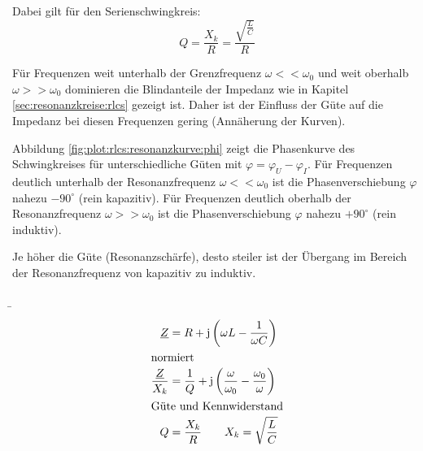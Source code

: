 \begin{frame}[t]
{Dabei gilt für den Serienschwingkreis:
\begin{equation}
    Q = \frac{X_k}{R} = \frac{\sqrt{\frac{L}{C}}}{R}
\end{equation}

Für Frequenzen weit unterhalb der Grenzfrequenz $\omega << \omega_0$ und weit oberhalb $\omega >> \omega_0$
dominieren die Blindanteile der Impedanz wie in Kapitel \ref{sec:resonanzkreise:rlcs} gezeigt ist. 
Daher ist der Einfluss der Güte auf die Impedanz bei diesen Frequenzen gering (Annäherung der Kurven).


Abbildung \ref{fig:plot:rlcs:resonanzkurve:phi} zeigt die Phasenkurve des Schwingkreises für unterschiedliche Güten mit $\varphi = \varphi_U - \varphi_I$.
Für Frequenzen deutlich unterhalb der Resonanzfrequenz $\omega << \omega_0$ ist die Phasenverschiebung $\varphi$ nahezu $-90^\circ$ (rein kapazitiv).
Für Frequenzen deutlich oberhalb der Resonanzfrequenz $\omega >> \omega_0$ ist die Phasenverschiebung $\varphi$ nahezu $+90^\circ$ (rein induktiv).

Je höher die Güte (Resonanzschärfe), desto steiler ist der Übergang im Bereich der Resonanzfrequenz von kapazitiv zu induktiv.
}%
\b{%
\begin{minipage}{0.3\textwidth}%
\begin{align}
    \underline{Z} &= R + \mathrm{j}\left(\omega L - \frac{1}{\omega C}\right)\\
        \intertext{normiert}
    \frac{\underline{Z}}{X_k} &= \frac{1}{Q} + \mathrm{j}\left(\frac{\omega}{\omega_0} - \frac{\omega_0}{\omega}\right)\\
        \intertext{Güte und Kennwiderstand}
    Q &= \frac{X_k}{R} \qquad X_k = \sqrt{\frac{L}{C}}
\end{align}
\end{minipage}\hfill%
\begin{minipage}{0.65\textwidth}\centering
\end{minipage}
}%
\end{frame}

